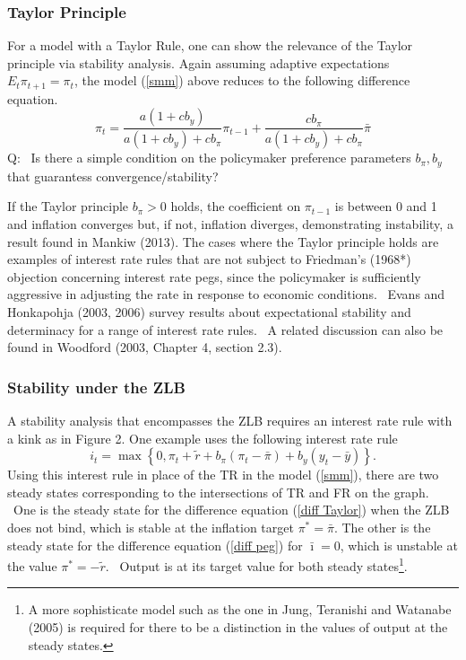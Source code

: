 \documentclass{article}
\begin{document}
\begin{doublespace}
\subsubsection{Taylor Principle}

For a model with a Taylor Rule, one can show the relevance of the Taylor
principle via stability analysis. Again assuming adaptive expectations $%
E_{t}\pi _{t+1}=\pi _{t}$, the model (\ref{smm}) above reduces to the
following difference equation.%
\begin{equation}
\pi _{t}=\frac{a\left( 1+cb_{y}\right) }{a\left( 1+cb_{y}\right) +cb_{\pi }}%
\pi _{t-1}+\frac{cb_{\pi }}{a\left( 1+cb_{y}\right) +cb_{\pi }}\bar{\pi}
\label{diff Taylor}
\end{equation}%
Q: \ Is there a simple condition on the policymaker preference parameters $%
b_{\pi },b_{y}$ that guarantess convergence/stability?

If the Taylor principle $b_{\pi }>0$ holds, the coefficient on $\pi _{t-1}$
is between 0 and 1 and inflation converges but, if not, inflation diverges,
demonstrating instability, a result found in Mankiw (2013). The cases where
the Taylor principle holds are examples of interest rate rules that are not
subject to Friedman's (1968*) objection concerning interest rate pegs, since
the policymaker is sufficiently aggressive in adjusting the rate in response
to economic conditions. \ Evans and Honkapohja (2003, 2006) survey results
about expectational stability and determinacy for a range of interest rate
rules. \ A related discussion can also be found in Woodford (2003, Chapter
4, section 2.3).

\subsubsection{Stability under the ZLB}

A stability analysis that encompasses the ZLB requires an interest rate rule
with a kink as in Figure 2. One example uses the following interest rate rule%
\begin{equation*}
i_{t}=\max \left\{ 0,\pi _{t}+\widetilde{r}+b_{\pi }\left( \pi _{t}-\bar{\pi}%
\right) +b_{y}\left( y_{t}-\bar{y}\right) \right\} .
\end{equation*}%
Using this interest rule in place of the TR in the model (\ref{smm}), there
are two steady states corresponding to the intersections of TR and FR on the
graph. \ One is the steady state for the difference equation (\ref{diff
Taylor}) when the ZLB does not bind, which is stable at the inflation target 
$\pi ^{\ast }=\bar{\pi}$. The other is the steady state for the difference
equation (\ref{diff peg}) for $\bar{\imath}=0$, which is unstable at the
value $\pi ^{\ast }=-\widetilde{r}$. \ Output is at its target value for
both steady states\footnote{%
A more sophisticate model such as the one in Jung, Teranishi and Watanabe
(2005) is required for there to be a distinction in the values of output at
the steady states.}.


\end{doublespace}
\end{document}
